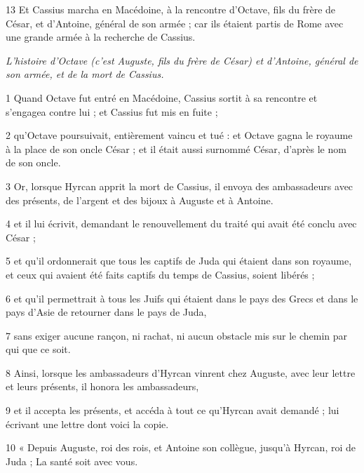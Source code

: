 \par 13 Et Cassius marcha en Macédoine, à la rencontre d'Octave, fils du frère de César, et d'Antoine, général de son armée ; car ils étaient partis de Rome avec une grande armée à la recherche de Cassius.


\par \textit{L'histoire d'Octave (c'est Auguste, fils du frère de César) et d'Antoine, général de son armée, et de la mort de Cassius.}

\par 1 Quand Octave fut entré en Macédoine, Cassius sortit à sa rencontre et s'engagea contre lui ; et Cassius fut mis en fuite ;

\par 2 qu'Octave poursuivait, entièrement vaincu et tué : et Octave gagna le royaume à la place de son oncle César ; et il était aussi surnommé César, d'après le nom de son oncle.

\par 3 Or, lorsque Hyrcan apprit la mort de Cassius, il envoya des ambassadeurs avec des présents, de l'argent et des bijoux à Auguste et à Antoine.

\par 4 et il lui écrivit, demandant le renouvellement du traité qui avait été conclu avec César ;

\par 5 et qu'il ordonnerait que tous les captifs de Juda qui étaient dans son royaume, et ceux qui avaient été faits captifs du temps de Cassius, soient libérés ;

\par 6 et qu'il permettrait à tous les Juifs qui étaient dans le pays des Grecs et dans le pays d'Asie de retourner dans le pays de Juda,

\par 7 sans exiger aucune rançon, ni rachat, ni aucun obstacle mis sur le chemin par qui que ce soit.

\par 8 Ainsi, lorsque les ambassadeurs d'Hyrcan vinrent chez Auguste, avec leur lettre et leurs présents, il honora les ambassadeurs,

\par 9 et il accepta les présents, et accéda à tout ce qu'Hyrcan avait demandé ; lui écrivant une lettre dont voici la copie.

\par 10 « Depuis Auguste, roi des rois, et Antoine son collègue, jusqu'à Hyrcan, roi de Juda ; La santé soit avec vous.

